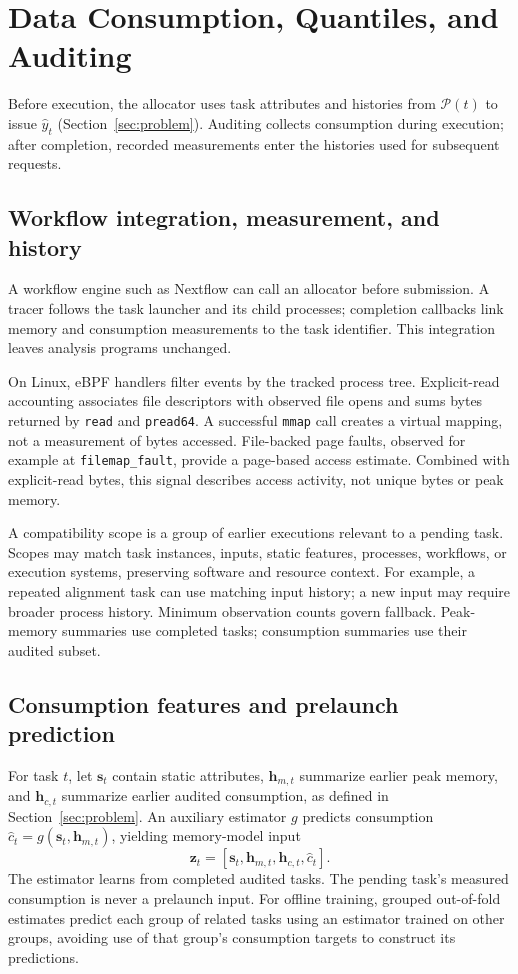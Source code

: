 \section{Data Consumption, Quantiles, and Auditing}
\label{sec:design}
Before execution, the allocator uses task attributes and histories from
$\mathcal{P}(t)$ to issue $\hat y_t$ (Section~\ref{sec:problem}). Auditing
collects consumption during execution; after completion, recorded
measurements enter the histories used for subsequent requests.

\subsection{Workflow integration, measurement, and history}
\label{sec:history}
A workflow engine such as Nextflow can call an allocator before submission.
A tracer follows the task launcher and its child processes; completion
callbacks link memory and consumption measurements to the task identifier.
This integration leaves analysis programs unchanged.

On Linux, eBPF handlers filter events by the tracked process tree.
Explicit-read accounting associates file descriptors with observed file opens
and sums bytes returned by \texttt{read} and \texttt{pread64}.
A successful \texttt{mmap} call creates a virtual mapping, not a measurement
of bytes accessed. File-backed page faults, observed for example at
\texttt{filemap\_fault}, provide a page-based access estimate. Combined with
explicit-read bytes, this signal describes access activity, not unique
bytes or peak memory.

A compatibility scope is a group of earlier executions relevant to a
pending task. Scopes may match task instances, inputs, static features,
processes, workflows, or execution systems, preserving software and
resource context. For example, a repeated alignment task can use matching
input history; a new input may require broader process history. Minimum
observation counts govern fallback. Peak-memory summaries use completed
tasks; consumption summaries use their audited subset.

\subsection{Consumption features and prelaunch prediction}
\label{sec:consumption}
For task $t$, let $\mathbf{s}_t$ contain static attributes,
$\mathbf{h}_{m,t}$ summarize earlier peak memory, and $\mathbf{h}_{c,t}$
summarize earlier audited consumption, as defined in Section~\ref{sec:problem}.
An auxiliary estimator $g$ predicts consumption
$\hat c_t=g(\mathbf{s}_t,\mathbf{h}_{m,t})$, yielding memory-model input
\begin{equation}
\mathbf{z}_t = [\mathbf{s}_t,\mathbf{h}_{m,t},\mathbf{h}_{c,t},\hat c_t].
\label{eq:general_features}
\end{equation}
The estimator learns from completed audited tasks. The pending task's
measured consumption is never a prelaunch input. For offline training,
grouped out-of-fold estimates predict each group of related tasks using
an estimator trained on other groups, avoiding use of that group's
consumption targets to construct its predictions.

